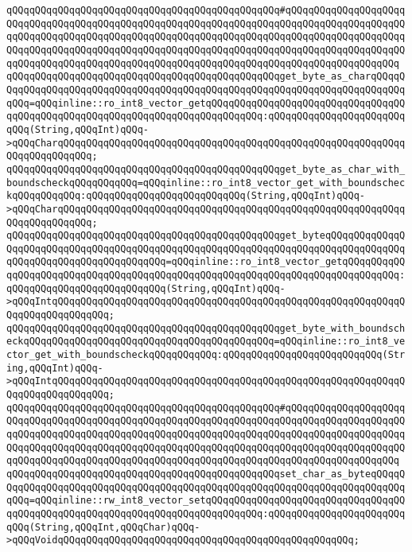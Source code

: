 \verb|qQQqqQQqqQQqqQQqqQQqqQQqqQQqqQQqqQQqqQQqqQQqqQQq#qQQqqQQqqQQqqQQqqQQqqQQqqQQqqQQqqQQqqQQqqQQqqQQqqQQqqQQqqQQqqQQqqQQqqQQqqQQqqQQqqQQqqQQqqQQqqQQqqQQqqQQqqQQqqQQqqQQqqQQqqQQqqQQqqQQqqQQqqQQqqQQqqQQqqQQqqQQqqQQqqQQqqQQqqQQqqQQqqQQqqQQqqQQqqQQqqQQqqQQqqQQqqQQqqQQqqQQqqQQqqQQqqQQqqQQqqQQqqQQqqQQqqQQqqQQqqQQqqQQqqQQqqQQqqQQqqQQqqQQqqQQqqQQqqQQqqQQqqQQq|\newline
\verb|qQQqqQQqqQQqqQQqqQQqqQQqqQQqqQQqqQQqqQQqqQQqqQQqget_byte_as_charqQQqqQQqqQQqqQQqqQQqqQQqqQQqqQQqqQQqqQQqqQQqqQQqqQQqqQQqqQQqqQQqqQQqqQQqqQQqqQQq=qQQqinline::ro_int8_vector_getqQQqqQQqqQQqqQQqqQQqqQQqqQQqqQQqqQQqqQQqqQQqqQQqqQQqqQQqqQQqqQQqqQQqqQQqqQQqqQQq:qQQqqQQqqQQqqQQqqQQqqQQqqQQq(String,qQQqInt)qQQq->qQQqCharqQQqqQQqqQQqqQQqqQQqqQQqqQQqqQQqqQQqqQQqqQQqqQQqqQQqqQQqqQQqqQQqqQQqqQQqqQQq;|\newline
\verb|qQQqqQQqqQQqqQQqqQQqqQQqqQQqqQQqqQQqqQQqqQQqqQQqget_byte_as_char_with_boundscheckqQQqqQQqqQQq=qQQqinline::ro_int8_vector_get_with_boundscheckqQQqqQQqqQQq:qQQqqQQqqQQqqQQqqQQqqQQqqQQq(String,qQQqInt)qQQq->qQQqCharqQQqqQQqqQQqqQQqqQQqqQQqqQQqqQQqqQQqqQQqqQQqqQQqqQQqqQQqqQQqqQQqqQQqqQQqqQQq;|\newline
\verb|qQQqqQQqqQQqqQQqqQQqqQQqqQQqqQQqqQQqqQQqqQQqqQQqget_byteqQQqqQQqqQQqqQQqqQQqqQQqqQQqqQQqqQQqqQQqqQQqqQQqqQQqqQQqqQQqqQQqqQQqqQQqqQQqqQQqqQQqqQQqqQQqqQQqqQQqqQQqqQQqqQQq=qQQqinline::ro_int8_vector_getqQQqqQQqqQQqqQQqqQQqqQQqqQQqqQQqqQQqqQQqqQQqqQQqqQQqqQQqqQQqqQQqqQQqqQQqqQQqqQQq:qQQqqQQqqQQqqQQqqQQqqQQqqQQq(String,qQQqInt)qQQq->qQQqIntqQQqqQQqqQQqqQQqqQQqqQQqqQQqqQQqqQQqqQQqqQQqqQQqqQQqqQQqqQQqqQQqqQQqqQQqqQQqqQQq;|\newline
\verb|qQQqqQQqqQQqqQQqqQQqqQQqqQQqqQQqqQQqqQQqqQQqqQQqget_byte_with_boundscheckqQQqqQQqqQQqqQQqqQQqqQQqqQQqqQQqqQQqqQQqqQQq=qQQqinline::ro_int8_vector_get_with_boundscheckqQQqqQQqqQQq:qQQqqQQqqQQqqQQqqQQqqQQqqQQq(String,qQQqInt)qQQq->qQQqIntqQQqqQQqqQQqqQQqqQQqqQQqqQQqqQQqqQQqqQQqqQQqqQQqqQQqqQQqqQQqqQQqqQQqqQQqqQQqqQQq;|\newline
\verb|qQQqqQQqqQQqqQQqqQQqqQQqqQQqqQQqqQQqqQQqqQQqqQQq#qQQqqQQqqQQqqQQqqQQqqQQqqQQqqQQqqQQqqQQqqQQqqQQqqQQqqQQqqQQqqQQqqQQqqQQqqQQqqQQqqQQqqQQqqQQqqQQqqQQqqQQqqQQqqQQqqQQqqQQqqQQqqQQqqQQqqQQqqQQqqQQqqQQqqQQqqQQqqQQqqQQqqQQqqQQqqQQqqQQqqQQqqQQqqQQqqQQqqQQqqQQqqQQqqQQqqQQqqQQqqQQqqQQqqQQqqQQqqQQqqQQqqQQqqQQqqQQqqQQqqQQqqQQqqQQqqQQqqQQqqQQqqQQqqQQqqQQqqQQq|\newline
\verb|qQQqqQQqqQQqqQQqqQQqqQQqqQQqqQQqqQQqqQQqqQQqqQQqset_char_as_byteqQQqqQQqqQQqqQQqqQQqqQQqqQQqqQQqqQQqqQQqqQQqqQQqqQQqqQQqqQQqqQQqqQQqqQQqqQQqqQQq=qQQqinline::rw_int8_vector_setqQQqqQQqqQQqqQQqqQQqqQQqqQQqqQQqqQQqqQQqqQQqqQQqqQQqqQQqqQQqqQQqqQQqqQQqqQQqqQQq:qQQqqQQqqQQqqQQqqQQqqQQqqQQq(String,qQQqInt,qQQqChar)qQQq->qQQqVoidqQQqqQQqqQQqqQQqqQQqqQQqqQQqqQQqqQQqqQQqqQQqqQQqqQQq;|\newline
